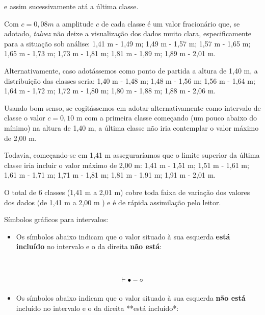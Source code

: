 \documentclass[
]{book}
\providecommand{\tightlist}{%
  \setlength{\itemsep}{0pt}\setlength{\parskip}{0pt}}
\begin{document}
\hfill\break

e assim sucessivamente atá a última classe.

\hfill\break

Com \(c=0,08m\) a amplitude \(c\) de cada classe é um valor fracionário que, se adotado, \emph{talvez} não deixe a visualização dos dados muito clara, especificamente para a situação sob análise: 1,41 m - 1,49 m; 1,49 m - 1,57 m; 1,57 m - 1,65 m; 1,65 m - 1,73 m; 1,73 m - 1,81 m; 1,81 m - 1,89 m; 1,89 m - 2,01 m.

\hfill\break

Alternativamente, caso adotássemos como ponto de partida a altura de 1,40 m, a distribuição das classes seria: 1,40 m - 1,48 m; 1,48 m - 1,56 m; 1,56 m - 1,64 m; 1,64 m - 1,72 m; 1,72 m - 1,80 m; 1,80 m - 1,88 m; 1,88 m - 2,06 m.

\hfill\break

Usando bom senso, se cogitássemos em adotar alternativamente como intervalo de classe o valor \(c=0,10\) m com a primeira classe começando (um pouco abaixo do mínimo) na altura de 1,40 m, a última classe não iria contemplar o valor máximo de 2,00 m.

\hfill\break

Todavia, começando-se em 1,41 m asseguraríamos que o limite superior da última classe iria incluir o valor máximo de 2,00 m: 1,41 m - 1,51 m; 1,51 m - 1,61 m; 1,61 m - 1,71 m; 1,71 m - 1,81 m; 1,81 m - 1,91 m; 1,91 m - 2,01 m.

\hfill\break

O total de 6 classes (1,41 m a 2,01 m) cobre toda faixa de variação dos valores dos dados (de 1,41 m a 2,00 m ) e é de rápida assimilação pelo leitor.

\hfill\break

Símbolos gráficos para intervalos:

\hfill\break

\begin{itemize}
\tightlist
\item
  Os símbolos abaixo indicam que o valor situado à sua esquerda \textbf{está incluído} no intervalo e o da direita \textbf{não está}:
\end{itemize}

~

\[
\vdash \\
{\bullet}-{\circ}
\]

\hfill\break

\begin{itemize}
\tightlist
\item
  Os símbolos abaixo indicam que o valor situado à sua esquerda \textbf{não está} incluído no intervalo e o da direita **está incluído*:
\end{itemize}
\end{document}
